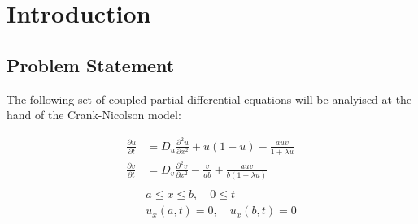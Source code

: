 \section{Introduction}

\subsection{Problem Statement}

The following set of coupled partial differential equations will be
analyised at the hand of the Crank-Nicolson model:

\begin{align*}
\frac{\partial u}{\partial t} &= D_u \frac{\partial^2 u}{\partial x^2} +
                                 u(1 - u) - \frac{auv}{1+\lambda u} \\
\frac{\partial v}{\partial t} &= D_v \frac{\partial^2 v}{\partial x^2} -
                                 \frac{v}{ab} + \frac{auv}{b(1+\lambda u)} \\
                                 \\
                              & a \leq x \leq b, \quad 0 \leq t \\
                              & u_x(a,t) = 0, \quad u_x(b,t) = 0
\end{align*}
